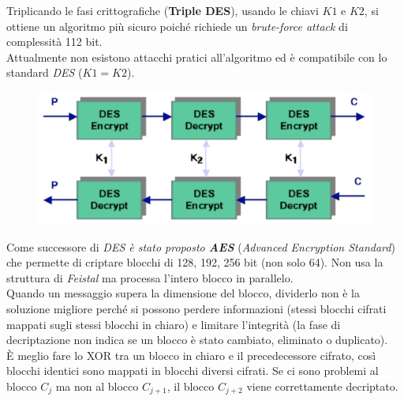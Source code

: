 \documentclass[11pt, a4paper, twoside, italian]{report}
\theoremstyle{plain}
\begin{document}
\begin{multicols}{2}
	\noindent
	Triplicando le fasi crittografiche (\textbf{Triple DES}), usando le chiavi $K1$ e $K2$, si ottiene un algoritmo più sicuro poiché richiede un \textit{brute-force attack} di complessità 112 bit.\\
	Attualmente non esistono attacchi pratici all'algoritmo ed è compatibile con lo standard \textit{DES} ($K1 = K2$).
	\columnbreak
	\begin{figure}[H]
		\centering
		\includegraphics[scale=0.3]{tripleDES}
	\end{figure}
\end{multicols}
\noindent
Come successore di \textit{DES è stato proposto \textbf{AES}} (\textit{Advanced Encryption Standard}) che permette di criptare blocchi di 128, 192, 256 bit (non solo 64). Non usa la struttura di \textit{Feistal} ma processa l'intero blocco in parallelo.\\
Quando un messaggio supera la dimensione del blocco, dividerlo non è la soluzione migliore perché si possono perdere informazioni (stessi blocchi cifrati mappati sugli stessi blocchi in chiaro) e limitare l'integrità (la fase di decriptazione non indica se un blocco è stato cambiato, eliminato o duplicato).\\
È meglio fare lo XOR tra un blocco in chiaro e il precedecessore cifrato, così blocchi identici sono mappati in blocchi diversi cifrati. Se ci sono problemi al blocco $C_j$ ma non al blocco $C_{j+1}$, il blocco $C_{j+2}$ viene correttamente decriptato.
\end{document}
